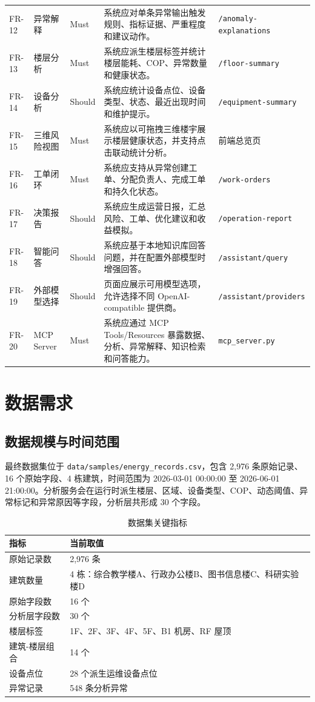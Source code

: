 \documentclass[12pt,a4paper]{ctexart}
\newcommand{\code}[1]{{\footnotesize\nolinkurl{#1}}}
\begin{document}
\begin{longtable}{p{2cm}p{3.5cm}p{1.7cm}p{5.3cm}p{2.2cm}}
FR-12 & 异常解释 & Must & 系统应对单条异常输出触发规则、指标证据、严重程度和建议动作。 & \code{/anomaly-explanations} \\
FR-13 & 楼层分析 & Must & 系统应派生楼层标签并统计楼层能耗、COP、异常数量和健康状态。 & \code{/floor-summary} \\
FR-14 & 设备分析 & Should & 系统应统计设备点位、设备类型、状态、最近出现时间和维护提示。 & \code{/equipment-summary} \\
FR-15 & 三维风险视图 & Must & 系统应以可拖拽三维楼宇展示楼层健康状态，并支持点击联动统计分析。 & 前端总览页 \\
FR-16 & 工单闭环 & Must & 系统应支持从异常创建工单、分配负责人、完成工单和持久化状态。 & \code{/work-orders} \\
FR-17 & 决策报告 & Should & 系统应生成运营日报，汇总风险、工单、优化建议和收益模拟。 & \code{/operation-report} \\
FR-18 & 智能问答 & Should & 系统应基于本地知识库回答问题，并在配置外部模型时增强回答。 & \code{/assistant/query} \\
FR-19 & 外部模型选择 & Should & 页面应展示可用模型选项，允许选择不同 OpenAI-compatible 提供商。 & \code{/assistant/providers} \\
FR-20 & MCP Server & Must & 系统应通过 MCP Tools/Resources 暴露数据、分析、异常解释、知识检索和问答能力。 & \code{mcp_server.py} \\
\bottomrule
\end{longtable}

\section{数据需求}
\subsection{数据规模与时间范围}
最终数据集位于 \code{data/samples/energy_records.csv}，包含 2,976 条原始记录、16 个原始字段、4 栋建筑，时间范围为 2026-03-01 00:00:00 至 2026-06-01 21:00:00。分析服务会在运行时派生楼层、区域、设备类型、COP、动态阈值、异常标记和异常原因等字段，分析层共形成 30 个字段。

\begin{table}[H]
\centering
\caption{数据集关键指标}
\begin{tabularx}{\textwidth}{p{4cm}Y}
\toprule
指标 & 当前取值 \\
\midrule
原始记录数 & 2,976 条 \\
建筑数量 & 4 栋：综合教学楼A、行政办公楼B、图书信息楼C、科研实验楼D \\
原始字段数 & 16 个 \\
分析层字段数 & 30 个 \\
楼层标签 & 1F、2F、3F、4F、5F、B1 机房、RF 屋顶 \\
建筑-楼层组合 & 14 个 \\
设备点位 & 28 个派生运维设备点位 \\
异常记录 & 548 条分析异常 \\
\bottomrule
\end{tabularx}
\end{table}
\end{document}
